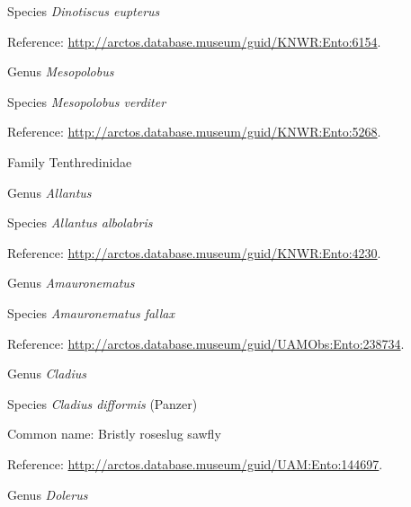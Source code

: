 \documentclass[9pt, article]{memoir}
\begin{document}
\begin{multicols}{2}
\vspace{6pt}\noindent\hspace{36pt}Species \textit{Dinotiscus eupterus}


Reference: 
\url{http://arctos.database.museum/guid/KNWR:Ento:6154}.

\vspace{6pt}\noindent\hspace{30pt}Genus \textit{Mesopolobus}


\vspace{6pt}\noindent\hspace{36pt}Species \textit{Mesopolobus verditer}


Reference: 
\url{http://arctos.database.museum/guid/KNWR:Ento:5268}.

\vspace{6pt}\noindent\hspace{24pt}Family Tenthredinidae


\vspace{6pt}\noindent\hspace{30pt}Genus \textit{Allantus}


\vspace{6pt}\noindent\hspace{36pt}Species \textit{Allantus albolabris}


Reference: 
\url{http://arctos.database.museum/guid/KNWR:Ento:4230}.

\vspace{6pt}\noindent\hspace{30pt}Genus \textit{Amauronematus}


\vspace{6pt}\noindent\hspace{36pt}Species \textit{Amauronematus fallax}


Reference: 
\url{http://arctos.database.museum/guid/UAMObs:Ento:238734}.

\vspace{6pt}\noindent\hspace{30pt}Genus \textit{Cladius}


\vspace{6pt}\noindent\hspace{36pt}Species \textit{Cladius difformis} (Panzer)


Common name: Bristly roseslug sawfly

Reference: 
\url{http://arctos.database.museum/guid/UAM:Ento:144697}.

\vspace{6pt}\noindent\hspace{30pt}Genus \textit{Dolerus}



\end{multicols}
\end{document}
